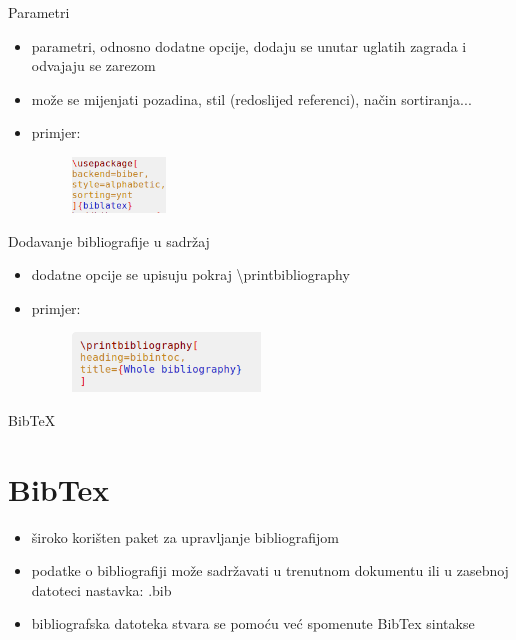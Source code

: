 \documentclass{beamer}
\begin{document}
\begin{frame}{Parametri}
\begin{itemize}
	\item parametri, odnosno dodatne opcije, dodaju se unutar uglatih zagrada i odvajaju se zarezom \\
	\item može se mijenjati pozadina, stil (redoslijed referenci), način sortiranja... \\
	\item primjer:
	\begin{figure}
		\includegraphics[width=2.5cm]{drugiprimjer.png}
	\end{figure}
\end{itemize}
\end{frame}

\begin{frame}{Dodavanje bibliografije u sadržaj}
\begin{itemize}
	\item dodatne opcije se upisuju pokraj \textbackslash printbibliography \\
	\item primjer:
	\begin{figure}
	\includegraphics[width=5cm]{treciprimjer.png}
	\end{figure}
\end{itemize}
\end{frame}

\begin{frame}{BibTeX\cite{bibtex}}
\section{BibTex}
\begin{itemize}
    \item široko korišten paket za upravljanje bibliografijom \\
    \item podatke o bibliografiji može sadržavati u trenutnom 
    dokumentu ili u zasebnoj datoteci nastavka: .bib \\
    \item bibliografska datoteka stvara se pomoću već spomenute
    BibTex sintakse \\
\end{itemize}
\end{frame}
\end{document}
